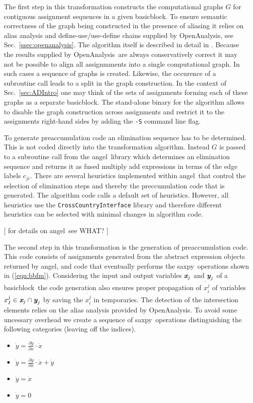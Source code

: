 \documentclass[11pt]{article}
\newcommand{\angel}{angel}
\newcommand{\basicblock}{basicblock}
\newcommand{\OpenAnalysis}{OpenAnalysis}
\newcommand{\saxpy}{saxpy}
\newcommand{\bmx}{\mbox{\bf\em x}}
\newcommand{\bmy}{\mbox{\bf\em y}}
\newcommand{\code}[1]{{\small\tt{#1}}}
\newcommand{\refsec}[1]{{Sec.~\ref{#1}}}
\newcommand{\refeqn}[1]{{(\ref{#1})}}
\begin{document}
The first step in this transformation constructs the computational graphs $G$ 
for contiguous 
assignment sequences in a given \basicblock. To ensure semantic 
correctness of the graph being constructed in the presence of 
aliasing it relies on alias analysis and define-use/use-define chains 
supplied by \OpenAnalysis, see \refsec{ssec:openanalysis}.
The algorithm itself is described in detail in \cite{Utk04FBB}.
Because the results supplied by \OpenAnalysis\ are always 
conservatively correct it may not be possible to align all 
assignmments into a single computational graph. In such cases 
a sequence of graphs is created. Likewise, the occurence 
of a subroutine call leads to a split in the graph construction. 
In the context of \refsec{sec:ADIntro} one may think of the sets of 
assignments forming each of these graphs as a separate \basicblock. 
The stand-alone binary for the algorithm allows to disable 
the graph construction across assignments and restrict it to 
the assignments right-hand sides by adding the \code{-S} command 
line flag. 

To generate preaccumulation code an elimination sequence has to be determined. 
This is not coded directly into the transformation algorithm. Instead 
$G$ is passed to a subroutine call from the \angel\ library \cite{angelWeb}
which determines an elimination sequence and returns it as 
fused multiply add expressions in terms of the edge labels $c_{ji}$.
There are several heuristics implemented within \angel\ that control 
the selection of elimination steps and thereby the preccumulation code 
that is generated.  The algorithm code calls a default set of heuristics. 
However, all heuristics use the \code{CrossCountryInterface} library and therefore 
different heuristics can be selected with minimal changes in algorithm code.   

{\color{red} [ for details on \angel\ see WHAT? ] } 

The second step in this transformation is the generation of preaccumulation code. 
This code consists of assignments generated from  the abstract expression objects returned by \angel, 
and code that eventually performs the \saxpy\ operations shown in \refeqn{eqn:bbfm}. 
Considering the input and output variables $\bmx_j$ and $\bmy_j$ of a \basicblock\ the code generation 
also ensures proper propagation of $\dot{x_i^j}$ of variables $ x_I^j \in  \bmx_j \cap \bmy_j$ 
by saving the $\dot{x_i^j}$ in temporaries.
The detection of the intersection elements relies on the alias analysis provided by 
\OpenAnalysis.
To avoid some uncessary overhead 
we create a sequence of \saxpy\ operations distinguishing the following categories (leaving off 
the indices). 
\begin{itemize}
\item $\dot{y} = \frac{\partial y }{\partial x }\cdot \dot{x}$
\item $\dot{y} = \frac{\partial y }{\partial x }\cdot \dot{x} + \dot{y}$
\item $\dot{y} = \dot{x}$
\item $\dot{y} = 0$	
\end{itemize}
\end{document}
